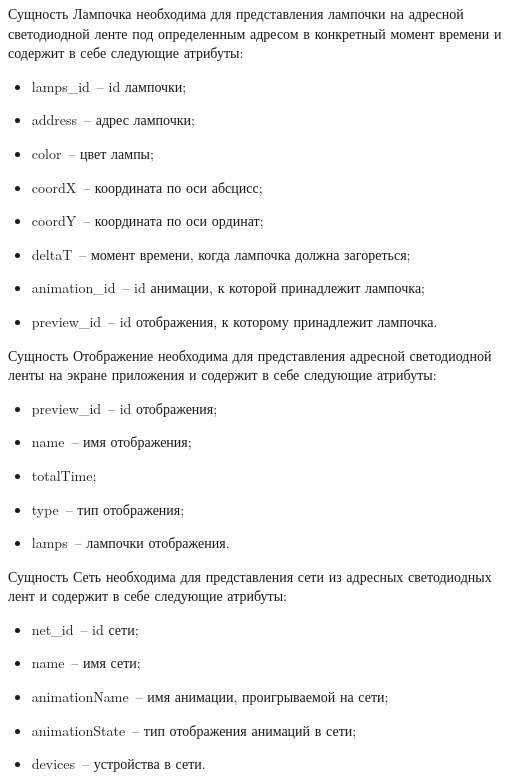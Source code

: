Сущность Лампочка необходима для представления лампочки на адресной светодиодной ленте под определенным адресом в конкретный момент времени и содержит в себе следующие атрибуты:
\begin{itemize}
	\item lamps\_id~-- id лампочки;
	\item address~-- адрес лампочки;
	\item color~-- цвет лампы;
	\item coordX~-- координата по оси абсцисс;
	\item coordY~-- координата по оси ординат;
	\item deltaT~-- момент времени, когда лампочка должна загореться;
	\item animation\_id~-- id анимации, к которой принадлежит лампочка;
	\item preview\_id~-- id отображения, к которому принадлежит лампочка.
\end{itemize}

Сущность Отображение необходима для представления адресной светодиодной ленты на экране приложения и содержит в себе следующие атрибуты:
\begin{itemize}
	\item preview\_id~-- id отображения;
	\item name~-- имя отображения;
	\item totalTime;
	\item type~-- тип отображения;
	\item lamps~-- лампочки отображения.
\end{itemize}

Сущность Сеть необходима для представления сети из адресных светодиодных лент и содержит в себе следующие атрибуты:
\begin{itemize}
	\item net\_id~-- id сети;
	\item name~-- имя сети;
	\item animationName~-- имя анимации, проигрываемой на сети;
	\item animationState~-- тип отображения анимаций в сети;
	\item devices~-- устройства в сети.
\end{itemize}

